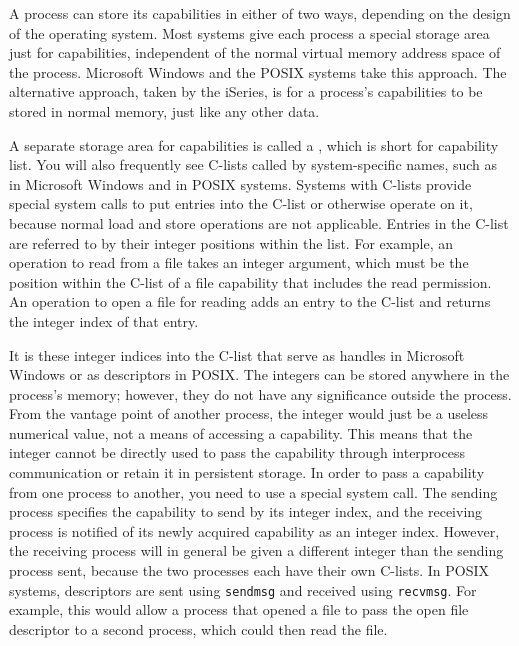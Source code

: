 A process can store its capabilities in either of two ways, depending
on the design of the operating system.  Most systems give each process
a special storage area just for capabilities, independent of the
normal virtual memory address space of the process.  Microsoft Windows
and the POSIX systems take this approach.  The alternative approach,
taken by the iSeries, is for a process's capabilities to be stored in normal
memory, just like any other data.

A separate storage area for capabilities is called a ,
which is
short for capability list.  You will also frequently see C-lists called by system-specific
names, such as  in Microsoft Windows
and  in POSIX systems.  Systems with C-lists provide special
system calls to put entries into the C-list or otherwise operate on
it, because normal load and store operations are not applicable.
Entries in the C-list are referred to by their integer positions within
the list.  For example, an operation to read from a file takes
an integer argument, which must be the position within the C-list of a
file capability that includes the read permission.  An operation to open a
file for reading adds an entry to the C-list and returns the integer
index of that entry.

It is these integer indices into the C-list that serve as handles in
Microsoft Windows or as descriptors in POSIX.  The integers can be stored
anywhere in the process's memory; however, they do not have any
significance outside the process.  From the vantage point of 
another process, the integer would just be a useless numerical value, not
a means of accessing a capability.  This means that the integer
cannot be directly used to pass the capability through
interprocess communication or retain it in persistent storage.  In order to
pass a capability from one process to another, you need to use a
special system call.  The sending process specifies the capability to
send by its integer index, and the receiving process is notified of
its newly acquired capability as an integer index.  However, the
receiving process will in general be given a different integer than
the sending process sent, because the two processes each have their own
C-lists.  In POSIX systems, descriptors are sent using
\verb|sendmsg| and received using
\verb|recvmsg|.  For example, this
would allow a process that opened a file to pass the open file descriptor
to a second process, which could then read the file.

